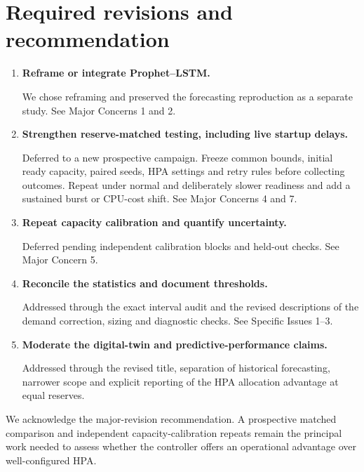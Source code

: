 \documentclass[10pt,a4paper]{article}
\newcommand{\reply}[2]{\item \textbf{#1}\par\noindent #2}
\begin{document}
\section*{Required revisions and recommendation}
\begin{enumerate}
\reply{Reframe or integrate Prophet--LSTM.}{We chose reframing and preserved the forecasting reproduction as a separate study. See Major Concerns 1 and 2.}
\reply{Strengthen reserve-matched testing, including live startup delays.}{Deferred to a new prospective campaign. Freeze common bounds, initial ready capacity, paired seeds, HPA settings and retry rules before collecting outcomes. Repeat under normal and deliberately slower readiness and add a sustained burst or CPU-cost shift. See Major Concerns 4 and 7.}
\reply{Repeat capacity calibration and quantify uncertainty.}{Deferred pending independent calibration blocks and held-out checks. See Major Concern 5.}
\reply{Reconcile the statistics and document thresholds.}{Addressed through the exact interval audit and the revised descriptions of the demand correction, sizing and diagnostic checks. See Specific Issues 1--3.}
\reply{Moderate the digital-twin and predictive-performance claims.}{Addressed through the revised title, separation of historical forecasting, narrower scope and explicit reporting of the HPA allocation advantage at equal reserves.}
\end{enumerate}

We acknowledge the major-revision recommendation. A prospective matched comparison and independent capacity-calibration repeats remain the principal work needed to assess whether the controller offers an operational advantage over well-configured HPA.
\end{document}

